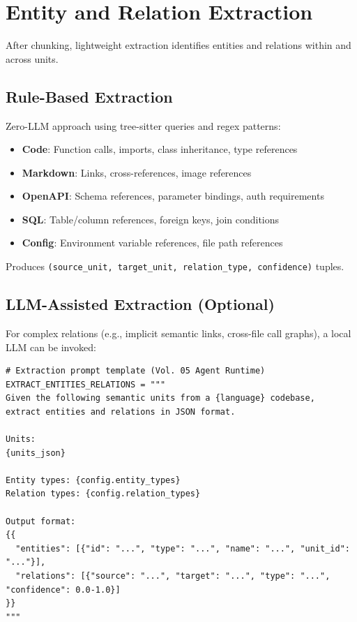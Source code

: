 \section{Entity and Relation Extraction}
\label{sec:parsing:entity-extraction}

After chunking, lightweight extraction identifies entities and relations within and across units.

\subsection{Rule-Based Extraction}
\label{sec:parsing:rule-extraction}

Zero-LLM approach using tree-sitter queries and regex patterns:
\begin{itemize}
  \item \textbf{Code}: Function calls, imports, class inheritance, type references
  \item \textbf{Markdown}: Links, cross-references, image references
  \item \textbf{OpenAPI}: Schema references, parameter bindings, auth requirements
  \item \textbf{SQL}: Table/column references, foreign keys, join conditions
  \item \textbf{Config}: Environment variable references, file path references
\end{itemize}

Produces \texttt{(source\_unit, target\_unit, relation\_type, confidence)} tuples.

\subsection{LLM-Assisted Extraction (Optional)}
\label{sec:parsing:llm-extraction}

For complex relations (e.g., implicit semantic links, cross-file call graphs), a local LLM can be invoked:

\begin{verbatim}
# Extraction prompt template (Vol. 05 Agent Runtime)
EXTRACT_ENTITIES_RELATIONS = """
Given the following semantic units from a {language} codebase,
extract entities and relations in JSON format.

Units:
{units_json}

Entity types: {config.entity_types}
Relation types: {config.relation_types}

Output format:
{{
  "entities": [{"id": "...", "type": "...", "name": "...", "unit_id": "..."}],
  "relations": [{"source": "...", "target": "...", "type": "...", "confidence": 0.0-1.0}]
}}
"""
\end{verbatim}

